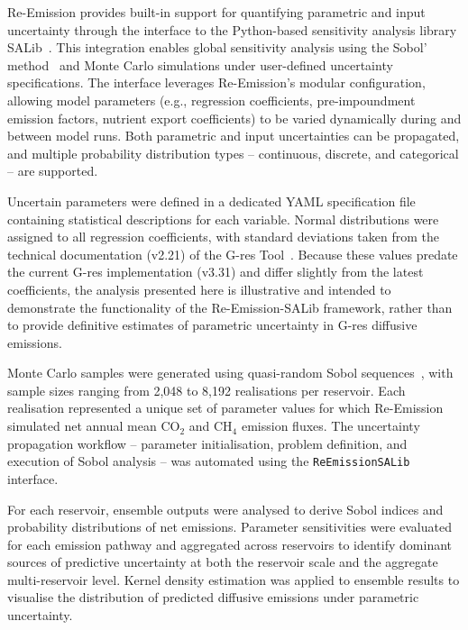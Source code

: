 \documentclass[review, authoryear, 1p]{elsarticle} %
\begin{document}
Re-Emission provides built-in support for quantifying parametric and input uncertainty through the interface to the Python-based sensitivity analysis library SALib~\citep{Iwanaga_Toward_SALib_2_0_2022}.
This integration enables global sensitivity analysis using the Sobol’ method~\citep{Sobol2001, Saltelli2002} and Monte Carlo simulations under user-defined uncertainty specifications.
The interface leverages Re-Emission's modular configuration, allowing model parameters (e.g., regression coefficients, pre-impoundment emission factors, nutrient export coefficients) to be varied dynamically during and between model runs.
Both parametric and input uncertainties can be propagated, and multiple probability distribution types -- continuous, discrete, and categorical -- are supported.

Uncertain parameters were defined in a dedicated YAML specification file containing statistical descriptions for each variable.
Normal distributions were assigned to all regression coefficients, with standard deviations taken from the technical documentation (v2.21) of the G-res Tool~\citep{Prairie2017b_old}.
Because these values predate the current G-res implementation (v3.31) and differ slightly from the latest coefficients, the analysis presented here is illustrative and intended to demonstrate the functionality of the {Re-Emission}-{SALib} framework, rather than to provide definitive estimates of parametric uncertainty in G-res diffusive emissions.

Monte Carlo samples were generated using quasi-random Sobol sequences~\citep{Saltelli2002}, with sample sizes ranging from 2,048 to 8,192 realisations per reservoir.
Each realisation represented a unique set of parameter values for which Re-Emission simulated net annual mean CO$_2$ and CH$_4$ emission fluxes.
The uncertainty propagation workflow -- parameter initialisation, problem definition, and execution of Sobol analysis -- was automated using the \texttt{ReEmissionSALib} interface.

For each reservoir, ensemble outputs were analysed to derive Sobol indices and probability distributions of net emissions. 
Parameter sensitivities were evaluated for each emission pathway and aggregated across reservoirs to identify dominant sources of predictive uncertainty at both the reservoir scale and the aggregate multi-reservoir level.
Kernel density estimation was applied to ensemble results to visualise the distribution of predicted diffusive emissions under parametric uncertainty.
\end{document}
